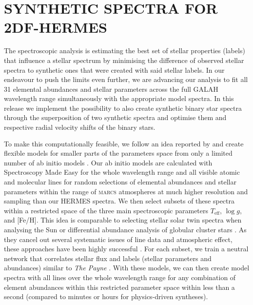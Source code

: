 \documentclass[
  journal=pasa,
  manuscript=research-paper, %
  year=2023,
  volume=37
]{cup-journal}
\newcommand{\Teff}{$T_\mathrm{eff}$\xspace}
\newcommand{\logg}{$\log g$\xspace}
\begin{document}
\newpage
\section{SYNTHETIC SPECTRA FOR 2DF-HERMES}
\label{sec:synthetic_spectra}

The spectroscopic analysis is estimating the best set of stellar properties (labels) that influence a stellar spectrum by minimising the difference of observed stellar spectra to synthetic ones that were created with said stellar labels. In our endeavour to push the limits even further, we are advancing our analysis to fit all 31 elemental abundances and stellar parameters across the full GALAH wavelength range simultaneously with the appropriate model spectra. In this release we implement the possibility to also create synthetic binary star spectra through the superposition of two synthetic spectra and optimise them and respective radial velocity shifts of the binary stars.

To make this computationally feasible, we follow an idea reported by \citet{Rix2016} and create flexible models for smaller parts of the parameters space from only a limited number of ab initio models \citep[see also][]{Ting2016b}. Our ab initio models are calculated with Spectroscopy Made Easy \citep[\textsc{sme}][]{Valenti1996,Piskunov2017} for the whole wavelength range and all visible atomic and molecular lines for random selections of elemental abundances and stellar parameters within the range of \textsc{marcs} atmospheres \citep{Gustafsson2008} at much higher resolution and sampling than our HERMES spectra. We then select subsets of these spectra within a restricted space of the three main spectroscopic parameters \Teff, \logg, and [Fe/H]. This idea is comparable to selecting stellar solar twin spectra when analysing the Sun \citep[see e.g.]{Nissen2015} or differential abundance analysis of globular cluster stars \citep[e.g.][and Monty et al. in prep]{Yong2013}. As they cancel out several systematic issues of line data and atmospheric effect, these approaches have been highly successful \citep{Nissen2018}. For each subset, we train a neutral network that correlates stellar flux and labels (stellar parameters and abundances) similar to \textit{The Payne} \citep{Ting2019}. With these models, we can then create model spectra with all lines over the whole wavelength range for any combination of element abundances within this restricted parameter space within less than a second (compared to minutes or hours for physics-driven syntheses). 
\end{document}
